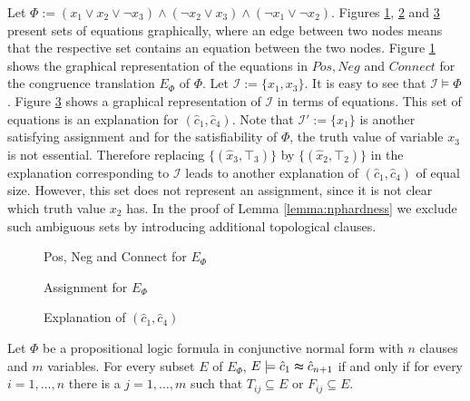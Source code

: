 \begin{example}

Let $\Phi := (x_1 \vee x_2 \vee \neg x_3) \wedge (\neg x_2 \vee x_3) \wedge (\neg x_1 \vee \neg x_2)$. 
Figures \ref{fig:npexamplebig}, \ref{fig:npassignment} and \ref{fig:npexplanation} present sets of equations graphically, where an edge between two nodes means that the respective set contains an equation between the two nodes.
Figure \ref{fig:npexamplebig} shows the graphical representation of the equations in $Pos, Neg$ and $Connect$ for the congruence translation $E_{\Phi}$ of $\Phi$.
Let $\mathcal{I} := \{x_1,x_3\}$. 
It is easy to see that $\mathcal{I} \models \Phi$.
Figure \ref{fig:npexplanation} shows a graphical representation of $\mathcal{I}$ in terms of equations.
This set of equations is an explanation for $(\hat{c}_1,\hat{c}_4)$.
Note that $\mathcal{I}' := \{x_1\}$ is another satisfying assignment and for the satisfiability of $\Phi$, the truth value of variable $x_3$ is not essential.
Therefore replacing $\{(\hat{x}_3,\top_3)\}$ by $\{(\hat{x}_2,\top_2)\}$ in the explanation corresponding to $\mathcal{I}$ leads to another explanation of $(\hat{c}_1,\hat{c}_4)$ of equal size.
However, this set does not represent an assignment, since it is not clear which truth value $x_2$ has.
In the proof of Lemma \ref{lemma:nphardness} we exclude such ambiguous sets by introducing additional topological clauses.
\begin{figure}[!h]


\caption{Pos, Neg and Connect for $E_{\Phi}$}
\label{fig:npexamplebig}
\end{figure}


\begin{figure}[!h]


\caption{Assignment for $E_{\Phi}$}
\label{fig:npassignment}
\end{figure}

\begin{figure}[!h]


\caption{Explanation of $(\hat{c}_1,\hat{c}_4)$}
\label{fig:npexplanation}
\end{figure}

\end{example}


\begin{lemma}
\label{lemma:charexpl}

Let $\Phi$ be a propositional logic formula in conjunctive normal form with $n$ clauses and $m$ variables.
For every subset $E$ of $E_{\Phi}$, $E \models \hat{c}_1 \thickapprox \hat{c}_{n+1}$ if and only if for every $i = 1,\ldots,n$ there is a $j = 1,\ldots,m$ such that $T_{ij} \subseteq E$ or $F_{ij} \subseteq E$.

\end{lemma}

